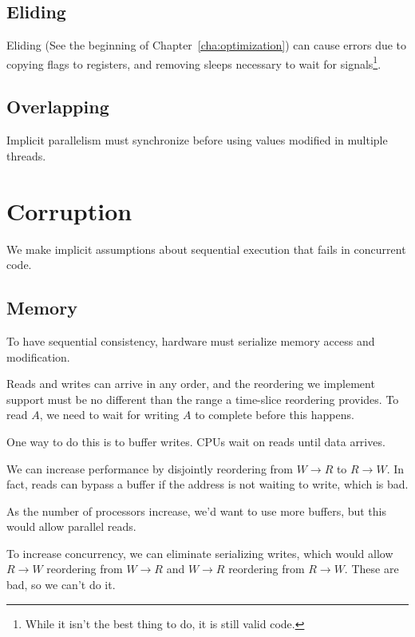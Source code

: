             \subsection{Eliding} %
            \label{sub:eliding}
                Eliding (See the beginning of Chapter~\ref{cha:optimization}) can cause errors due to copying flags to registers, and removing sleeps necessary to wait for signals\footnote{While it isn't the best thing to do, it is still valid code.}.
            \subsection{Overlapping} %
            \label{sub:overlapping}
                Implicit parallelism must synchronize before using values modified in multiple threads.
        \section{Corruption} %
        \label{sec:corruption}
            We make implicit assumptions about sequential execution that fails in concurrent code.
            \subsection{Memory} %
            \label{sub:memory}
                To have sequential consistency, hardware must serialize memory access and modification.

                Reads and writes can arrive in any order, and the reordering we implement support must be no different than the range a time-slice reordering provides.
                To read $A$, we need to wait for writing $A$ to complete before this happens.

                One way to do this is to buffer writes.
                CPUs wait on reads until data arrives.

                We can increase performance by disjointly reordering from $W \to R$ to $R \to W$.
                In fact, reads can bypass a buffer if the address is not waiting to write, which is bad.

                As the number of processors increase, we'd want to use more buffers, but this would allow parallel reads.

                To increase concurrency, we can eliminate serializing writes, which would allow $R \to W$ reordering from $W \to R$ and $W \to R$ reordering from $R \to W$.
                These are bad, so we can't do it.
